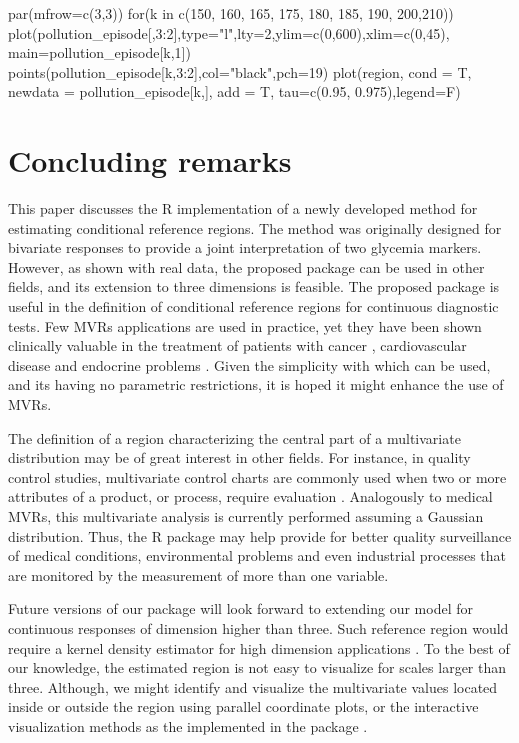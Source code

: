 \begin{example}
par(mfrow=c(3,3))
for(k in c(150, 160, 165, 175, 180, 185, 190, 200,210)){
	plot(pollution_episode[,3:2],type="l",lty=2,ylim=c(0,600),xlim=c(0,45),
	main=pollution_episode[k,1])
	points(pollution_episode[k,3:2],col="black",pch=19)
	plot(region, cond = T, newdata = pollution_episode[k,], add = T,
	tau=c(0.95, 0.975),legend=F)
}
\end{example}


\section{Concluding remarks}

This paper discusses the R implementation of a newly developed method for estimating conditional reference regions. The method was originally designed for bivariate responses to provide a joint interpretation of two glycemia markers. However, as shown with real data, the proposed package can be used in other fields, and its extension to three dimensions is feasible. The proposed package is useful in the definition of conditional reference regions for continuous diagnostic tests. Few MVRs applications are used in practice, yet they have been shown clinically valuable in the treatment of patients with cancer  \citep{mattsson2008multidimensional}, cardiovascular disease \citep{selmeryd2018derivation} and endocrine problems \citep{hoermann2016derivation}. Given the simplicity with which  can be used, and its having no parametric restrictions, it is hoped it might enhance the use of MVRs.

The definition of a region characterizing the central part of a multivariate distribution may be of great interest in other fields. For instance, in quality control studies, multivariate control charts are commonly used when two or more attributes of a product, or process, require evaluation \citep{fuchs1998multivariate}. Analogously to medical MVRs, this multivariate analysis is currently performed assuming a Gaussian distribution. Thus, the  R package may help provide for better quality surveillance of medical conditions, environmental problems and even industrial processes that are monitored by the measurement of more than one variable.

Future versions of our package will look forward to extending our model for continuous responses of dimension higher than three. Such reference region would require a kernel density estimator for high dimension applications \citep{kdevine}. To the best of our knowledge, the estimated region is not easy to visualize for scales larger than three. Although, we might identify and visualize the multivariate values located inside or outside the region using parallel coordinate plots, or the interactive visualization methods as the implemented in the  package \citep{wickham2011tourr}.

